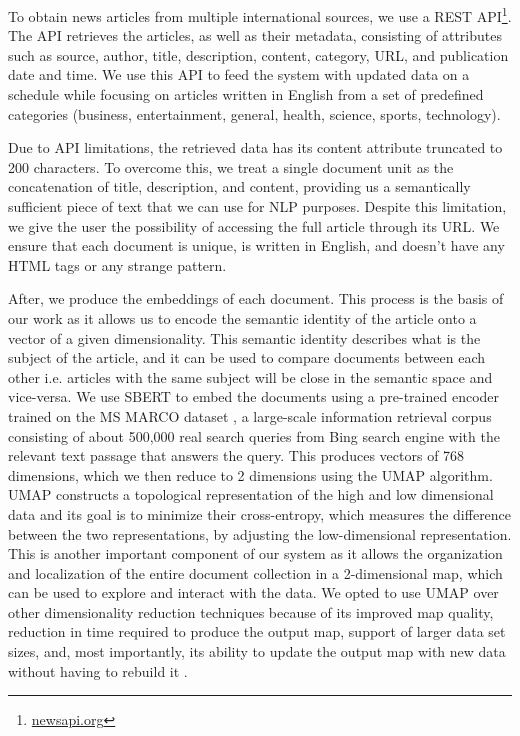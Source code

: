 \documentclass[a4paper]{article}
\begin{document}
To obtain news articles from multiple international sources, we use a REST API\footnote{\href{https://newsapi.org/}{newsapi.org}}. The API retrieves the articles, as well as their metadata, consisting of attributes such as source, author, title, description, content, category, URL, and publication date and time. We use this API to feed the system with updated data on a schedule while focusing on articles written in English from a set of predefined categories (business, entertainment, general, health, science, sports, technology).

Due to API limitations, the retrieved data has its content attribute truncated to 200 characters. To overcome this, we treat a single document unit as the concatenation of title, description, and content, providing us a semantically sufficient piece of text that we can use for NLP purposes. Despite this limitation, we give the user the possibility of accessing the full article through its URL. We ensure that each document is unique, is written in English, and doesn't have any HTML tags or any strange pattern.

After, we produce the embeddings of each document. This process is the basis of our work as it allows us to encode the semantic identity of the article onto a vector of a given dimensionality. This semantic identity describes what is the subject of the article, and it can be used to compare documents between each other i.e. articles with the same subject will be close in the semantic space and vice-versa. We use SBERT \citep{reimers2019} to embed the documents using a pre-trained encoder trained on the MS MARCO dataset \citep{bajaj2018}, a large-scale information retrieval corpus consisting of about 500,000 real search queries from Bing search engine with the relevant text passage that answers the query. This produces vectors of 768 dimensions, which we then reduce to 2 dimensions using the UMAP \citep{mcinnes2020} algorithm. UMAP constructs a topological representation of the high and low dimensional data and its goal is to minimize their cross-entropy, which measures the difference between the two representations, by adjusting the low-dimensional representation. This is another important component of our system as it allows the organization and localization of the entire document collection in a 2-dimensional map, which can be used to explore and interact with the data. We opted to use UMAP over other dimensionality reduction techniques because of its improved map quality, reduction in time required to produce the output map, support of larger data set sizes, and, most importantly, its ability to update the output map with new data without having to rebuild it \citep{mcinnes2020}.
\end{document}
